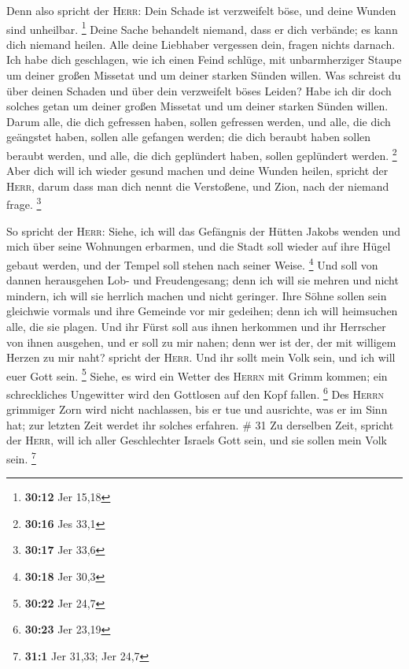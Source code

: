  Denn also spricht der \textsc{Herr}: Dein Schade ist
verzweifelt böse, und deine Wunden sind unheilbar. \footnote{\textbf{30:12}
  Jer 15,18}  Deine Sache behandelt niemand, dass er dich
verbände; es kann dich niemand heilen.  Alle deine
Liebhaber vergessen dein, fragen nichts darnach. Ich habe dich
geschlagen, wie ich einen Feind schlüge, mit unbarmherziger Staupe um
deiner großen Missetat und um deiner starken Sünden willen.
 Was schreist du über deinen Schaden und über dein
verzweifelt böses Leiden? Habe ich dir doch solches getan um deiner
großen Missetat und um deiner starken Sünden willen. 
Darum alle, die dich gefressen haben, sollen gefressen werden, und alle,
die dich geängstet haben, sollen alle gefangen werden; die dich beraubt
haben sollen beraubt werden, und alle, die dich geplündert haben, sollen
geplündert werden. \footnote{\textbf{30:16} Jes 33,1} 
Aber dich will ich wieder gesund machen und deine Wunden heilen, spricht
der \textsc{Herr}, darum dass man dich nennt die Verstoßene, und Zion,
nach der niemand frage. \footnote{\textbf{30:17} Jer 33,6}

 So spricht der \textsc{Herr}: Siehe, ich will das
Gefängnis der Hütten Jakobs wenden und mich über seine Wohnungen
erbarmen, und die Stadt soll wieder auf ihre Hügel gebaut werden, und
der Tempel soll stehen nach seiner Weise. \footnote{\textbf{30:18} Jer
  30,3}  Und soll von dannen herausgehen Lob- und
Freudengesang; denn ich will sie mehren und nicht mindern, ich will sie
herrlich machen und nicht geringer.  Ihre Söhne sollen
sein gleichwie vormals und ihre Gemeinde vor mir gedeihen; denn ich will
heimsuchen alle, die sie plagen.  Und ihr Fürst soll aus
ihnen herkommen und ihr Herrscher von ihnen ausgehen, und er soll zu mir
nahen; denn wer ist der, der mit willigem Herzen zu mir naht? spricht
der \textsc{Herr}.  Und ihr sollt mein Volk sein, und ich
will euer Gott sein. \footnote{\textbf{30:22} Jer 24,7} 
Siehe, es wird ein Wetter des \textsc{Herrn} mit Grimm kommen; ein
schreckliches Ungewitter wird den Gottlosen auf den Kopf fallen.
\footnote{\textbf{30:23} Jer 23,19}  Des \textsc{Herrn}
grimmiger Zorn wird nicht nachlassen, bis er tue und ausrichte, was er
im Sinn hat; zur letzten Zeit werdet ihr solches erfahren. \# 31
 Zu derselben Zeit, spricht der \textsc{Herr}, will ich
aller Geschlechter Israels Gott sein, und sie sollen mein Volk sein.
\footnote{\textbf{31:1} Jer 31,33; Jer 24,7}

